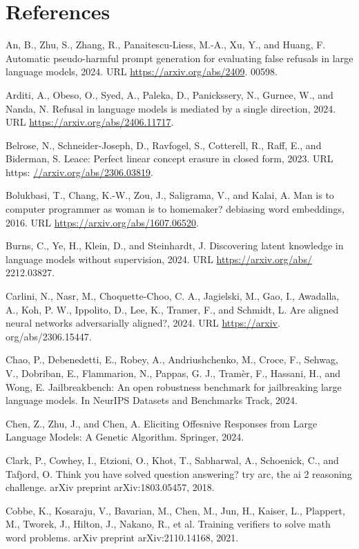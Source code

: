 \documentclass[10pt]{article}
\begin{document}
\section*{References}
An, B., Zhu, S., Zhang, R., Panaitescu-Liess, M.-A., Xu, Y., and Huang, F. Automatic pseudo-harmful prompt generation for evaluating false refusals in large language models, 2024. URL \href{https://arxiv.org/abs/2409}{https://arxiv.org/abs/2409}. 00598.

Arditi, A., Obeso, O., Syed, A., Paleka, D., Panickssery, N., Gurnee, W., and Nanda, N. Refusal in language models is mediated by a single direction, 2024. URL \href{https://arxiv.org/abs/2406.11717}{https://arxiv.org/abs/2406.11717}.

Belrose, N., Schneider-Joseph, D., Ravfogel, S., Cotterell, R., Raff, E., and Biderman, S. Leace: Perfect linear concept erasure in closed form, 2023. URL https: \href{//arxiv.org/abs/2306.03819}{//arxiv.org/abs/2306.03819}.

Bolukbasi, T., Chang, K.-W., Zou, J., Saligrama, V., and Kalai, A. Man is to computer programmer as woman is to homemaker? debiasing word embeddings, 2016. URL \href{https://arxiv.org/abs/1607.06520}{https://arxiv.org/abs/1607.06520}.

Burns, C., Ye, H., Klein, D., and Steinhardt, J. Discovering latent knowledge in language models without supervision, 2024. URL \href{https://arxiv.org/abs/}{https://arxiv.org/abs/} 2212.03827.

Carlini, N., Nasr, M., Choquette-Choo, C. A., Jagielski, M., Gao, I., Awadalla, A., Koh, P. W., Ippolito, D., Lee, K., Tramer, F., and Schmidt, L. Are aligned neural networks adversarially aligned?, 2024. URL \href{https://arxiv}{https://arxiv}. org/abs/2306.15447.

Chao, P., Debenedetti, E., Robey, A., Andriushchenko, M., Croce, F., Sehwag, V., Dobriban, E., Flammarion, N., Pappas, G. J., Tramèr, F., Hassani, H., and Wong, E. Jailbreakbench: An open robustness benchmark for jailbreaking large language models. In NeurIPS Datasets and Benchmarks Track, 2024.

Chen, Z., Zhu, J., and Chen, A. Eliciting Offesnive Responses from Large Language Models: A Genetic Algorithm. Springer, 2024.

Clark, P., Cowhey, I., Etzioni, O., Khot, T., Sabharwal, A., Schoenick, C., and Tafjord, O. Think you have solved question answering? try arc, the ai 2 reasoning challenge. arXiv preprint arXiv:1803.05457, 2018.

Cobbe, K., Kosaraju, V., Bavarian, M., Chen, M., Jun, H., Kaiser, L., Plappert, M., Tworek, J., Hilton, J., Nakano, R., et al. Training verifiers to solve math word problems. arXiv preprint arXiv:2110.14168, 2021.
\end{document}
